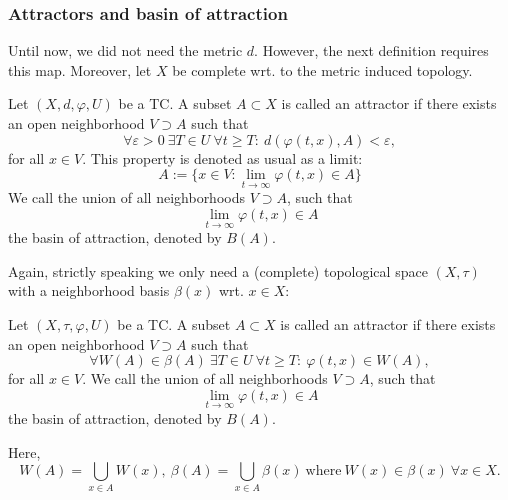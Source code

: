 \subsubsection{Attractors and basin of attraction}
Until now, we did not need the metric $d$. However, the next definition requires this map. Moreover, let $X$ be complete wrt. to the metric induced topology.
\begin{defi}
Let $(X, d, \varphi, U)$ be a TC. A subset $A \subset X$ is called an attractor if there exists an open neighborhood $V \supset A$ such that
$$\forall \varepsilon > 0\ \exists T \in U\ \forall t \geq T:\ d(\varphi(t,x),A) < \varepsilon,$$
for all $x \in V$. This property is denoted as usual as a limit:
$$A := \{x \in V : \lim_{t \rightarrow \infty} \varphi(t,x) \in A\}$$
We call the union of all neighborhoods $V \supset A$, such that
$$\lim_{t \rightarrow \infty}\varphi(t,x) \in A$$
the basin of attraction, denoted by $B(A)$.
\end{defi}
Again, strictly speaking we only need a (complete) topological space $(X,\tau)$ with a neighborhood basis $\beta(x)$ wrt. $x \in X$:
\begin{defi}
Let $(X, \tau, \varphi, U)$ be a TC. A subset $A \subset X$ is called an attractor if there exists an open neighborhood $V \supset A$ such that
$$\forall W(A) \in \beta(A)\ \exists T \in U\ \forall t \geq T:\ \varphi(t,x) \in W(A),$$
for all $x \in V$. We call the union of all neighborhoods $V \supset A$, such that
$$\lim_{t \rightarrow \infty}\varphi(t,x) \in A$$
the basin of attraction, denoted by $B(A)$.
\end{defi}
Here,
$$W(A) = \bigcup_{x \in A} W(x),\ \beta(A) = \bigcup_{x \in A} \beta(x)\ \mathrm{where}\ W(x) \in \beta(x)\ \forall x \in X.$$